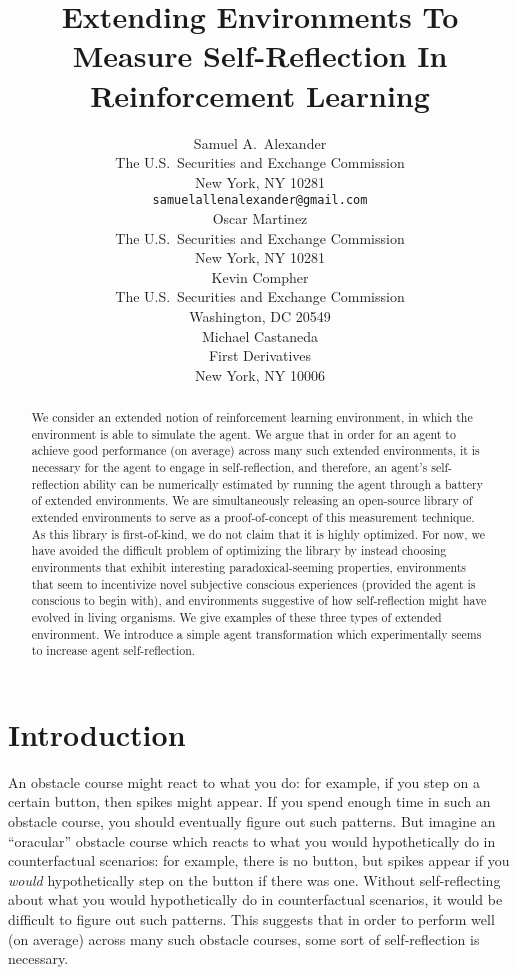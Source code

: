 \documentclass{article}
\title{Extending Environments To Measure Self-Reflection In Reinforcement Learning}
\author{
  Samuel A.~Alexander\\
  The U.S.\ Securities and Exchange Commission\\
  New York, NY 10281\\
  \texttt{samuelallenalexander@gmail.com}\\
  \And
  Oscar Martinez\\
  The U.S.\ Securities and Exchange Commission\\
  New York, NY 10281\\
  \And
  Kevin Compher\\
  The U.S.\ Securities and Exchange Commission\\
  Washington, DC 20549\\
  \And
  Michael Castaneda\\
  First Derivatives\\
  New York, NY 10006\\
}
\begin{document}
\maketitle

\begin{abstract}
  We consider an extended notion
  of reinforcement learning environment, in which the environment is able
  to simulate the agent. We argue that in order for an agent to achieve
  good performance (on average) across many such extended environments,
  it is necessary for the agent to engage in self-reflection, and therefore,
  an agent's self-reflection ability can be numerically estimated by running
  the agent through a battery of extended environments.
  We are simultaneously releasing an open-source library of extended
  environments to serve as a proof-of-concept of this measurement technique.
  As this library is first-of-kind, we do not claim that it is highly
  optimized. For now, we have avoided the difficult problem of optimizing
  the library by instead choosing environments that exhibit interesting
  paradoxical-seeming properties, environments that seem to incentivize
  novel subjective conscious experiences (provided the agent is conscious
  to begin with), and environments suggestive of how self-reflection might
  have evolved in living organisms. We give examples of these
  three types of extended environment. We introduce a simple agent
  transformation which experimentally seems to increase agent self-reflection.
\end{abstract}

\section{Introduction}

An obstacle course might react to what you do: for example, if you step on a certain
button, then spikes might appear. If you spend enough time in such an obstacle course,
you should eventually figure out such patterns.
But imagine an ``oracular'' obstacle course which reacts to
what you would hypothetically do in counterfactual scenarios: for example, there is
no button, but spikes appear
if you \emph{would} hypothetically step on the button if there was one. Without
self-reflecting about what you would hypothetically do in counterfactual scenarios, it
would be difficult to figure out such patterns. This suggests that in order to perform
well (on average) across many such obstacle courses, some sort of self-reflection is
necessary.
\end{document}
